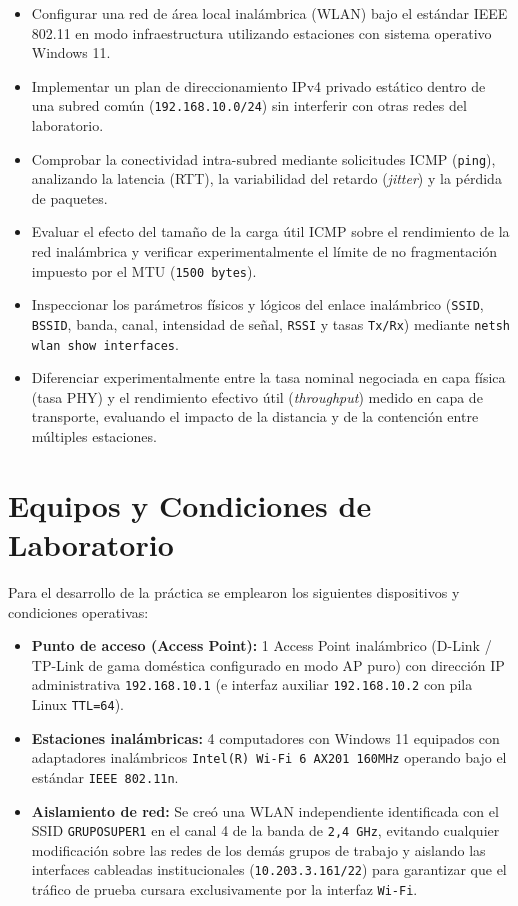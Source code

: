 \documentclass[11pt, a4paper]{article}
\begin{document}
\begin{itemize}
    \item Configurar una red de área local inalámbrica (WLAN) bajo el estándar IEEE 802.11 en modo infraestructura utilizando estaciones con sistema operativo Windows 11.
    \item Implementar un plan de direccionamiento IPv4 privado estático dentro de una subred común (\texttt{192.168.10.0/24}) sin interferir con otras redes del laboratorio.
    \item Comprobar la conectividad intra-subred mediante solicitudes ICMP (\texttt{ping}), analizando la latencia (RTT), la variabilidad del retardo (\textit{jitter}) y la pérdida de paquetes.
    \item Evaluar el efecto del tamaño de la carga útil ICMP sobre el rendimiento de la red inalámbrica y verificar experimentalmente el límite de no fragmentación impuesto por el MTU (\texttt{1500 bytes}).
    \item Inspeccionar los parámetros físicos y lógicos del enlace inalámbrico (\texttt{SSID}, \texttt{BSSID}, banda, canal, intensidad de señal, \texttt{RSSI} y tasas \texttt{Tx/Rx}) mediante \texttt{netsh wlan show interfaces}.
    \item Diferenciar experimentalmente entre la tasa nominal negociada en capa física (tasa PHY) y el rendimiento efectivo útil (\textit{throughput}) medido en capa de transporte, evaluando el impacto de la distancia y de la contención entre múltiples estaciones.
\end{itemize}

\section{Equipos y Condiciones de Laboratorio}

Para el desarrollo de la práctica se emplearon los siguientes dispositivos y condiciones operativas:
\begin{itemize}
    \item \textbf{Punto de acceso (Access Point):} 1 Access Point inalámbrico (D-Link / TP-Link de gama doméstica configurado en modo AP puro) con dirección IP administrativa \texttt{192.168.10.1} (e interfaz auxiliar \texttt{192.168.10.2} con pila Linux \texttt{TTL=64}).
    \item \textbf{Estaciones inalámbricas:} 4 computadores con Windows 11 equipados con adaptadores inalámbricos \texttt{Intel(R) Wi-Fi 6 AX201 160MHz} operando bajo el estándar \texttt{IEEE 802.11n}.
    \item \textbf{Aislamiento de red:} Se creó una WLAN independiente identificada con el SSID \texttt{GRUPOSUPER1} en el canal 4 de la banda de \texttt{2,4 GHz}, evitando cualquier modificación sobre las redes de los demás grupos de trabajo y aislando las interfaces cableadas institucionales (\texttt{10.203.3.161/22}) para garantizar que el tráfico de prueba cursara exclusivamente por la interfaz \texttt{Wi-Fi}.
\end{itemize}
\end{document}
